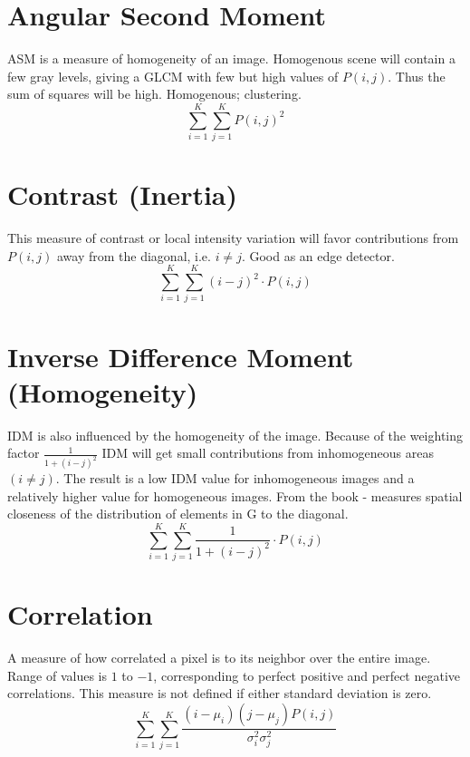 \documentclass[11pt]{report}
\begin{document}
\section*{Angular Second Moment}
ASM is a measure of homogeneity of an image. Homogenous scene will contain a few gray levels, giving a GLCM with few but high values of $P(i,j)$. Thus the sum of squares will be high. Homogenous; clustering.
\begin{equation}
\sum_{i=1}^{K}\sum_{j=1}^{K}P(i,j)^2
\end{equation}

\section*{Contrast (Inertia)}
This measure of contrast or local intensity variation will favor contributions from $P(i,j)$ away from the diagonal, i.e. $i \neq j$. Good as an edge detector.
\begin{equation}
\sum_{i=1}^{K}\sum_{j=1}^{K}(i-j)^2 \cdot P(i,j)
\end{equation}

\section*{Inverse Difference Moment (Homogeneity)}
IDM is also influenced by the homogeneity of the image. Because of the weighting factor $\frac{1}{1+(i-j)^2}$ IDM will get small contributions from inhomogeneous areas $(i \neq j)$. The result is a low IDM value for inhomogeneous images and a relatively higher value for homogeneous images. From the book - measures spatial closeness of the distribution of elements in G to the diagonal.
\begin{equation}
\sum_{i=1}^{K}\sum_{j=1}^{K} \frac{1}{1+(i-j)^2} \cdot P(i,j)
\end{equation}

\section*{Correlation}
A measure of how correlated a pixel is to its neighbor over the entire image. Range of values is $1$ to $-1$, corresponding to perfect positive and perfect negative correlations. This measure is not defined if either standard deviation is zero.
\begin{equation}
\sum_{i=1}^{K}\sum_{j=1}^{K}\frac{(i-\mu_i)(j-\mu_j)P(i,j)}{\sigma_i^2\sigma_j^2}
\end{equation}
\end{document}
